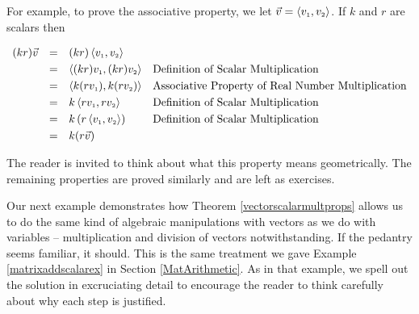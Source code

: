 \smallskip

For example, to prove the associative property, we let $\vec{v} = \left<v_{\mbox{\tiny $1$}},v_{\mbox{\tiny $2$}}\right>$.  If $k$ and $r$ are scalars then 

\[\begin{array}{rcll}

(kr) \vec{v} & = & (kr) \left<v_{\mbox{\tiny $1$}},v_{\mbox{\tiny $2$}}\right> & \\ [3pt]
						 & = &  \left<(kr) v_{\mbox{\tiny $1$}}, (kr) v_{\mbox{\tiny $2$}}\right> & \text{Definition of Scalar Multiplication} \\ [3pt]
						 & = &   \left<k (r v_{\mbox{\tiny $1$}}),  k (r v_{\mbox{\tiny $2$}})\right> & \text{Associative Property of Real Number Multiplication} \\ [3pt]
						 & = &   k\left<r v_{\mbox{\tiny $1$}},  r v_{\mbox{\tiny $2$}}\right> & \text{Definition of Scalar Multiplication} \\ [3pt]	
 						 & = &   k\left(r\left<v_{\mbox{\tiny $1$}}, v_{\mbox{\tiny $2$}}\right>\right) & \text{Definition of Scalar Multiplication} \\ [3pt]
						 & = & k(r\vec{v}) & \\ \end{array} \]
						 
The reader is invited to think about what this property means geometrically.  The remaining properties are proved similarly and are left as exercises.

\smallskip

Our next example demonstrates how Theorem \ref{vectorscalarmultprops} allows us to do the same kind of algebraic manipulations with vectors as we do with variables -- multiplication and division of vectors notwithstanding.  If the pedantry seems familiar, it should.  This is the same treatment we gave Example \ref{matrixaddscalarex} in Section \ref{MatArithmetic}.  As in that example,  we spell out the solution in excruciating detail to encourage the reader to think carefully about why each step is justified.



